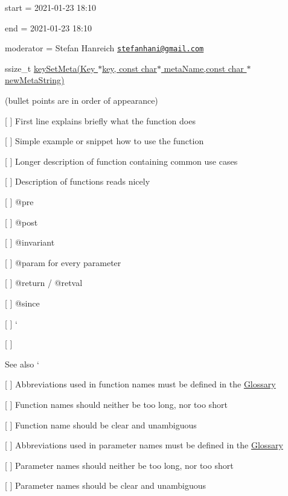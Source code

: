 
\begin{DoxyItemize}
\item start = 2021-\/01-\/23 18\+:10
\item end = 2021-\/01-\/23 18\+:10
\item moderator = Stefan Hanreich \href{mailto:stefanhani@gmail.com}{\tt stefanhani@gmail.\+com}
\end{DoxyItemize}

{\ttfamily ssize\+\_\+t \hyperlink{group__keymeta_gae1f15546b234ffb6007d8a31178652b9}{key\+Set\+Meta(\+Key $\ast$key, const char$\ast$ meta\+Name,const char $\ast$new\+Meta\+String)}}

(bullet points are in order of appearance)


\begin{DoxyItemize}
\item \mbox{[} \mbox{]} First line explains briefly what the function does
\item \mbox{[} \mbox{]} Simple example or snippet how to use the function
\item \mbox{[} \mbox{]} Longer description of function containing common use cases
\item \mbox{[} \mbox{]} Description of functions reads nicely
\item \mbox{[} \mbox{]} {\ttfamily @pre}
\item \mbox{[} \mbox{]} {\ttfamily @post}
\item \mbox{[} \mbox{]} {\ttfamily @invariant}
\item \mbox{[} \mbox{]} {\ttfamily @param} for every parameter
\item \mbox{[} \mbox{]} {\ttfamily @return} / {\ttfamily @retval}
\item \mbox{[} \mbox{]} {\ttfamily @since}
\item \mbox{[} \mbox{]} `{\ttfamily }
\item {\ttfamily \mbox{[} \mbox{]}}\begin{DoxySeeAlso}{See also}
`
\end{DoxySeeAlso}

\end{DoxyItemize}


\begin{DoxyItemize}
\item \mbox{[} \mbox{]} Abbreviations used in function names must be defined in the \hyperlink{doc_help_elektra-glossary_md}{Glossary}
\item \mbox{[} \mbox{]} Function names should neither be too long, nor too short
\item \mbox{[} \mbox{]} Function name should be clear and unambiguous
\item \mbox{[} \mbox{]} Abbreviations used in parameter names must be defined in the \hyperlink{doc_help_elektra-glossary_md}{Glossary}
\item \mbox{[} \mbox{]} Parameter names should neither be too long, nor too short
\item \mbox{[} \mbox{]} Parameter names should be clear and unambiguous
\end{DoxyItemize}

